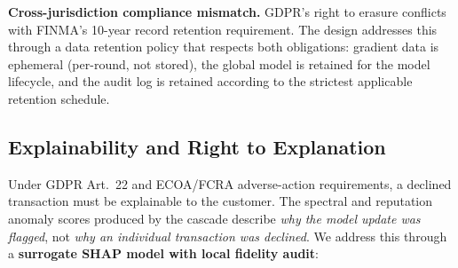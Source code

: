 \documentclass[10pt,journal]{IEEEtran}
\begin{document}
\textbf{Cross-jurisdiction compliance mismatch.} GDPR's right to erasure conflicts with FINMA's 10-year record retention requirement. The design addresses this through a data retention policy that respects both obligations: gradient data is ephemeral (per-round, not stored), the global model is retained for the model lifecycle, and the audit log is retained according to the strictest applicable retention schedule.

\subsection{Explainability and Right to Explanation}\label{sec:explainability}

Under GDPR Art.~22 and ECOA/FCRA adverse-action requirements, a declined transaction must be explainable to the customer. The spectral and reputation anomaly scores produced by the cascade describe \emph{why the model update was flagged}, not \emph{why an individual transaction was declined}. We address this through a \textbf{surrogate SHAP model with local fidelity audit}:
\end{document}
